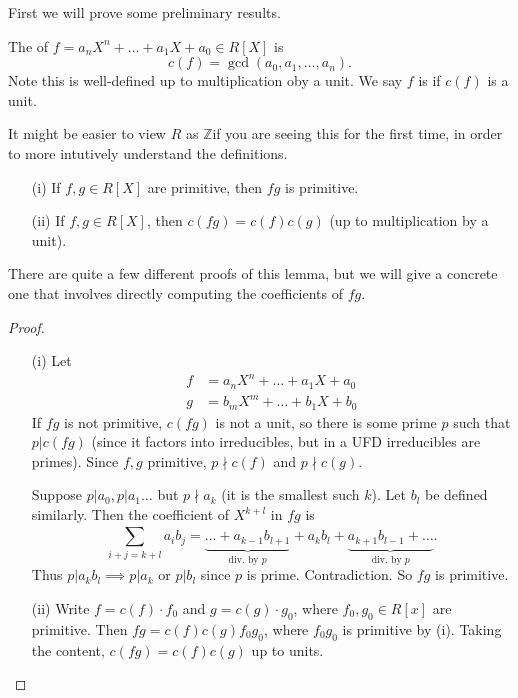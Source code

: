 \documentclass[egregdoesnotlikesansseriftitles,a4paper]{scrartcl}
\begin{document}
First we will prove some preliminary results.
\begin{definition*}[Content]
       The  of $f=a_n X^n +\ldots+a_1 X + a_0 \in R[X]$ is \[
       c (f)=\operatorname{gcd} (a_0 , a_1 , \ldots, a_n)
       .\] Note this is well-defined up to multiplication oby a unit. We say $f$ is  if $c (f)$ is a unit.
\end{definition*}
\begin{remark}
      It might be easier to view $R$ as $\mathbb{Z}$if you are seeing this for the first time, in order to more intutively understand the definitions.
\end{remark}
\begin{lemma}
      \begin{itemize}
            \item[(i)] If $f,g \in R[X]$ are primitive, then $fg$ is primitive.
            \item[(ii)] If $f,g \in R[X]$, then $c (fg)=c (f)c (g)$ (up to multiplication by a unit).
      \end{itemize}
      There are quite a few different proofs of this lemma, but we will give a concrete one that involves directly computing the coefficients of $fg$.
       \begin{proof}
              \begin{itemize}
                    \item[(i)] Let
                    \begin{align*}
                        f &= a_n X^{n}+\ldots+a_1 X+a_0\\
                        g&= b_m X^m + \ldots+ b_1 X+ b_0 
                    \end{align*}
                    If $fg$ is not primitive, $c (fg)$ is not a unit, so there is some prime $p$ such that $p| c (fg)$ (since it factors into irreducibles, but in a UFD irreducibles are primes). Since $f,g$ primitive, $p \nmid c (f)$ and $p \nmid c (g)$.

                    Suppose $p| a_0 , p | a_1 \ldots$ but $p \nmid a_k$ (it is the smallest such $k$). Let $b_l$ be defined similarly. Then the coefficient of $X^{k+l}$ in $fg$ is \[
                    \sum_{i+j=k+l}^{}a_{i}b_{j}=\underbrace{ \ldots+ a_{k-1}b_{l+1}}_{\text{div. by } p} +a_{k}b_{l}+\underbrace{a_{k+1}b_{l-1}+\ldots}_{\text{div. by } p} 
                    .\] Thus $p|a_{k}b_{l} \implies p |a_{k}$ or $p| b_{l}$ since $p $ is prime. Contradiction. So $fg$ is primitive.  
                    \item[(ii)] Write $f= c (f) \cdot f_0 $ and $g = c (g) \cdot g_0 $, where $f_0 , g_0 \in R[x]$ are primitive. Then $fg= c (f)c (g) f_0 g_0 $, where $f_0 g_0 $ is primitive by (i). Taking the content, $c (fg)=c (f )c (g)$ up to units.
              \end{itemize}
       \end{proof}
\end{lemma}
\end{document}
